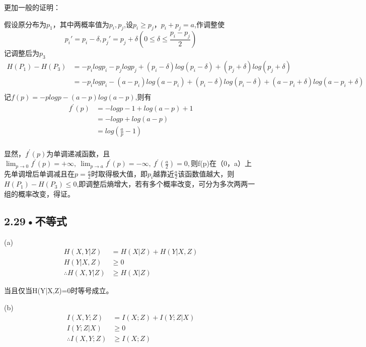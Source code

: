 \documentclass[UTF8]{ctexart}
\begin{document}
更加一般的证明：

假设原分布为\textbf{$p_1$}，其中两概率值为$p_i,p_j$,设$p_i\geqslant p_j，p_i+p_j=a$,作调整使$$p_i\prime = p_i-\delta, p_j\prime = p_j+\delta(0\leqslant\delta\leqslant \frac{p_i-p_j}{2} )$$
记调整后为\textbf{$p_3$}
\begin{equation*}
\begin{split}
H(P_1)-H(P_3)&=-p_ilogp_i-p_jlogp_j + (p_i-\delta)log(p_i-\delta) + (p_j+\delta)log(p_j+\delta)\\
&=  -p_ilogp_i-(a-p_i)log(a-p_i) + (p_i-\delta)log(p_i-\delta) + (a-p_i+\delta)log(a-p_i+\delta)\\
\end{split}
\end{equation*}
记$f(p)=-plogp-(a-p)log(a-p)$,则有
\begin{equation*}
\begin{split}
f^\prime (p)&=-logp -1 + log(a-p) + 1\\
&= -logp + log(a-p)\\
&= log(\frac{a}{p}-1)\\
\end{split}
\end{equation*}

显然，$f^\prime (p)$为单调递减函数，且$\lim_{p \to 0}f^\prime (p)=+\infty,\  \lim_{p \to a}f^\prime (p) = -\infty, \ f^\prime (\frac{a}{2})=0,$则f(p)在（0，a）上先单调增后单调减且在$p=\frac{a}{2}$时取得极大值，即$p_i$越靠近$\frac{a}{2}$该函数值越大，则$H(P_1)-H(P_3)\leqslant 0$,即调整后熵增大，若有多个概率改变，可分为多次两两一组的概率改变，得证。
\subsection*{2.29•不等式}

(a)
\begin{equation*}
\begin{split}
H(X,Y|Z)&=H(X|Z)+H(Y|X,Z)\\
H(Y|X,Z)& \geqslant 0\\
\therefore H(X,Y|Z)&\geqslant H(X|Z)
\end{split}
\end{equation*}

当且仅当H(Y|X,Z)=0时等号成立。

(b)
\begin{equation*}
\begin{split}
I(X,Y;Z)&=I(X;Z)+I(Y;Z|X)\\
I(Y;Z|X)& \geqslant 0\\
\therefore I(X,Y;Z)&\geqslant I(X;Z)
\end{split}
\end{equation*}
\end{document}
